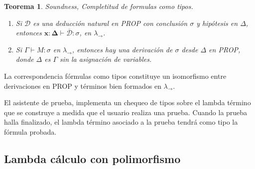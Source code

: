 \documentclass[a4paper,11pt]{article}
\newtheorem{theorem}{Teorema}
\theoremstyle{definition}
\begin{document}
\begin{theorem}
  Soundness, Completitud de formulas como tipos.

  \begin{enumerate}
  \item Si $\mathcal{D}$ es una deducción natural en PROP con conclusión $\sigma$ y hipótesis en $\Delta$, entonces
    $\bm{x}:\bm{\Delta} \vdash \overline{\mathcal{D}} : \sigma$, en $\lambda_{\rightarrow}$.
  \item Si $\Gamma \vdash M : \sigma$ en $\lambda_{\rightarrow}$, entonces hay una derivación de $\sigma$ desde $\Delta$ en PROP,
    donde $\Delta$ es $\Gamma$ sin la asignación de variables.
  \end{enumerate}

\end{theorem}

La correspondencia fórmulas como tipos constituye un isomorfismo entre derivaciones en PROP y términos bien formados en $\lambda_{\rightarrow}$.

El asistente de prueba, implementa un chequeo de tipos sobre el lambda término que se construye a
medida que el usuario realiza una prueba. 
Cuando la prueba halla finalizado, el lambda término asociado a la prueba tendrá como tipo la fórmula probada.


\subsection{Lambda cálculo con polimorfismo}
\label{Lambda cálculo con polimorfismo}
\end{document}
